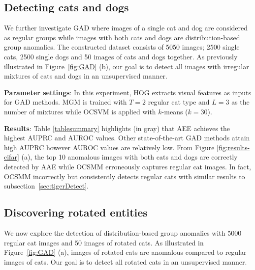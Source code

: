 \subsection{Detecting cats and dogs }
We further investigate GAD  %
where images of a single cat and dog are considered as regular groups while  images with both cats and dogs are distribution-based group anomalies.   The constructed dataset consists of 5050 images; 2500 single cats, 2500 single dogs and 50 images of  cats and dogs together. %
As previously illustrated in Figure~\ref{fig:GAD} (b), our goal is to detect all images with irregular mixtures of cats and dogs in an unsupervised manner.

\textbf{Parameter settings}:
In this experiment, HOG extracts visual features as inputs for GAD methods.
MGM is trained with $T=2$ regular cat type and $L=3$ as the number of mixtures while  OCSVM is applied with $k$-means ($k=30$).

{
\textbf{Results}:
Table  \ref{tablesummary} highlights (in gray) that AEE achieves the highest  AUPRC and AUROC values. %
Other state-of-the-art GAD methods attain high AUPRC however AUROC values are relatively low. From Figure  \ref{fig:results-cifar} (a), the top 10 anomalous images with both cats and dogs are correctly detected by AAE while OCSMM erroneously captures regular cat images. In fact, OCSMM incorrectly but consistently detects regular cats with similar results to subsection~\ref{sec:tigerDetect}.

}







\subsection{Discovering rotated entities }
We now explore the detection of distribution-based group anomalies with  5000  regular cat images and 50 images of rotated cats. As illustrated in Figure~\ref{fig:GAD} (a), images of rotated cats are anomalous  compared to regular images of cats. Our goal is to detect all rotated cats in an unsupervised manner.

